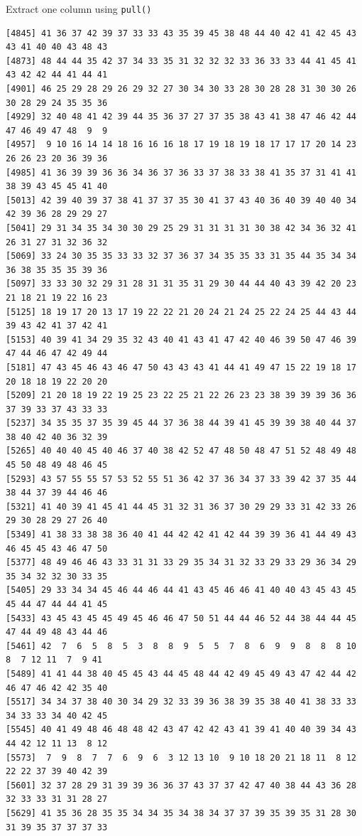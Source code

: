 \documentclass[
  ignorenonframetext,
  aspectratio=169,
]{beamer}
\let\oldtexttt\texttt
\renewcommand{\texttt}[1]{\colorbox{gray!20}{\oldtexttt{#1}}}
\begin{document}
\begin{frame}[fragile]{Extract one column using \texttt{pull()}}
\begin{verbatim}
[4845] 41 36 37 42 39 37 33 33 43 35 39 45 38 48 44 40 42 41 42 45 43 43 41 40 40 43 48 43
[4873] 48 44 44 35 42 37 34 33 35 31 32 32 32 33 36 33 33 44 41 45 41 43 42 42 44 41 44 41
[4901] 46 25 29 28 29 26 29 32 27 30 34 30 33 28 30 28 28 31 30 30 26 30 28 29 24 35 35 36
[4929] 32 40 48 41 42 39 44 35 36 37 27 37 35 38 43 41 38 47 46 42 44 47 46 49 47 48  9  9
[4957]  9 10 16 14 14 18 16 16 16 18 17 19 18 19 18 17 17 17 20 14 23 26 26 23 20 36 39 36
[4985] 41 36 39 39 36 36 34 36 37 36 33 37 38 33 38 41 35 37 31 41 41 38 39 43 45 45 41 40
[5013] 42 39 40 39 37 38 41 37 37 35 30 41 37 43 40 36 40 39 40 40 34 42 39 36 28 29 29 27
[5041] 29 31 34 35 34 30 30 29 25 29 31 31 31 31 30 38 42 34 36 32 41 26 31 27 31 32 36 32
[5069] 33 24 30 35 35 33 33 32 37 36 37 34 35 35 33 31 35 44 35 34 34 36 38 35 35 35 39 36
[5097] 33 33 30 32 29 31 28 31 31 35 31 29 30 44 44 40 43 39 42 20 23 21 18 21 19 22 16 23
[5125] 18 19 17 20 13 17 19 22 22 21 20 24 21 24 25 22 24 25 44 43 44 39 43 42 41 37 42 41
[5153] 40 39 41 34 29 35 32 43 40 41 43 41 47 42 40 46 39 50 47 46 39 47 44 46 47 42 49 44
[5181] 47 43 45 46 43 46 47 50 43 43 43 41 44 41 49 47 15 22 19 18 17 20 18 18 19 22 20 20
[5209] 21 20 18 19 22 19 25 23 22 25 21 22 26 23 23 38 39 39 39 36 36 37 39 33 37 43 33 33
[5237] 34 35 35 37 35 39 45 44 37 36 38 44 39 41 45 39 39 38 40 44 37 38 40 42 40 36 32 39
[5265] 40 40 40 45 40 46 37 40 38 42 52 47 48 50 48 47 51 52 48 49 48 45 50 48 49 48 46 45
[5293] 43 57 55 55 57 53 52 55 51 36 42 37 36 34 37 33 39 42 37 35 44 38 44 37 39 44 46 46
[5321] 41 40 39 41 45 41 44 45 31 32 31 36 37 30 29 29 33 31 42 33 26 29 30 28 29 27 26 40
[5349] 41 38 33 38 38 36 40 41 44 42 42 41 42 44 39 39 36 41 44 49 43 46 45 45 43 46 47 50
[5377] 48 49 46 46 43 33 31 31 33 29 35 34 31 32 33 29 33 29 36 34 29 35 34 32 32 30 33 35
[5405] 29 33 34 34 45 46 44 46 44 41 43 45 46 46 41 40 40 43 45 43 45 45 44 47 44 44 41 45
[5433] 43 45 43 45 45 49 45 46 46 47 50 51 44 44 46 52 44 38 44 44 45 47 44 49 48 43 44 46
[5461] 42  7  6  5  8  5  3  8  8  9  5  5  7  8  6  9  9  8  8  8 10  8  7 12 11  7  9 41
[5489] 41 41 44 38 40 45 45 43 44 45 48 44 42 49 45 49 43 47 42 44 42 46 47 46 42 42 35 40
[5517] 34 34 37 38 40 30 34 29 32 33 39 36 38 39 35 38 40 41 38 33 33 34 33 33 34 40 42 45
[5545] 40 41 49 48 46 48 48 42 43 47 42 42 43 41 39 41 40 40 39 34 43 44 42 12 11 13  8 12
[5573]  7  9  8  7  7  6  9  6  3 12 13 10  9 10 18 20 21 18 11  8 12 22 22 37 39 40 42 39
[5601] 32 37 28 29 31 39 39 36 36 37 43 37 37 42 47 40 38 44 43 36 28 32 33 33 31 31 28 27
[5629] 41 35 36 28 35 35 34 34 35 34 38 34 37 37 39 35 39 35 31 28 30 31 39 35 37 37 37 33

\end{verbatim}
\end{frame}
\end{document}
